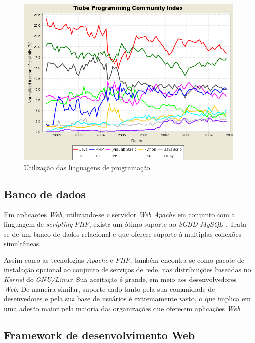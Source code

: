 \clearpage
\begin{figure}[h!tp]
    \begin{center}
        \includegraphics[scale=0.7]{./figuras/tpci_trends.png}

        \caption{\label{figura:linguagens_programacao}Utilização das linguagens de programação. \cite{Languages}}
    \end{center}
\end{figure}

\subsection{Banco de dados}

Em aplicações \textit{Web}, utilizando-se o servidor \textit{Web Apache} em conjunto com a linguagem de \textit{scripting PHP}, existe um ótimo suporte ao \textit{SGBD MySQL} \cite{php5PowerProgramming}. Trata-se de um banco de dados relacional e que oferece suporte à multiplas conexões simultâneas. \cite{MySQLreference}

Assim como as tecnologias \textit{Apache} e \textit{PHP}, também encontra-se como pacote de instalação opcional ao conjunto de serviços de rede, nas distribuições baseadas no \textit{Kernel} do \textit{GNU/Linux}. Sua aceitação é grande, em meio aos desenvolvedores \textit{Web}. De maneira similar, suporte dado tanto pela sua comunidade de desenvedores e pela sua base de usuários é extremamente vasto, o que implica em uma adesão maior pela maioria das organizações que oferecem aplicações \textit{Web}.

\subsection{Framework de desenvolvimento Web}


